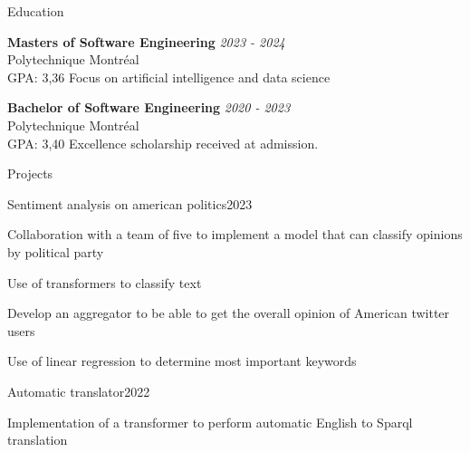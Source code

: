 \documentclass{resume} %
\begin{document}

\begin{rSection}{Education}

	{\bf Masters of Software Engineering} \hfill {\em 2023 - 2024}
	\\ Polytechnique Montréal
	\\GPA: 3,36 \hspace{0.5cm} Focus on artificial intelligence and data science

		{\bf Bachelor of Software Engineering} \hfill {\em 2020 - 2023}
	\\ Polytechnique Montréal
	\\GPA: 3,40 \hspace{0.5cm} Excellence scholarship received at admission.


\end{rSection}

\begin{rSection}{Projects}
	\begin{rSubsection}{Sentiment analysis on american politics}{2023}{}{}
		\item Collaboration with a team of five to implement a model that can classify opinions by political party
		\item Use of transformers to classify text
		\item Develop an aggregator to be able to get the overall opinion of American twitter users
		\item Use of linear regression to determine most important keywords
	\end{rSubsection}
	\begin{rSubsection}{Automatic translator}{2022}{}{}
		\item Implementation of a transformer to perform automatic English to Sparql translation
	\end{rSubsection}

\end{rSection}


\end{document}
